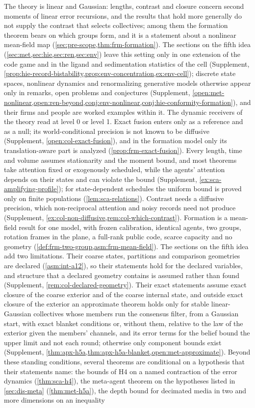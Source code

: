 The theory is linear and Gaussian: lengths, contrast and closure concern second moments of linear error recursions, and the results that hold more generally do not supply the contrast that selects collectives; among them the formation theorem bears on which groups form, and it is a statement about a nonlinear mean-field map (\cref{sec:pre-scope,thm:frm-formation}). The sections on the fifth idea (\cref{sec:met,sec:hie,sec:ren,sec:env}) leave this setting only in one extension of the code game and in the ligand and sedimentation statistics of the cell (Supplement, \cref{prop:hie-record-bistability,prop:env-concentration,ex:env-cell}); discrete state spaces, nonlinear dynamics and renormalizing generative models otherwise appear only in remarks, open problems and conjectures (Supplement, \cref{open:met-nonlinear,open:ren-beyond,conj:env-nonlinear,conj:hie-conformity-formation}), and their firms and people are worked examples within it. The dynamic receivers of the theory read at level 0 or level 1. Exact fusion enters only as a reference and as a null; its world-conditional precision is not known to be diffusive (Supplement, \cref{open:col-exact-fusion}), and in the formation model only its translation-aware part is analyzed (\cref{prop:frm-exact-fusion}). Every length, time and volume assumes stationarity and the moment bound, and most theorems take attention fixed or exogenously scheduled, while the agents' attention depends on their states and can violate the bound (Supplement, \cref{ex:sca-amplifying-profile}); for state-dependent schedules the uniform bound is proved only on finite populations (\cref{lem:sca-relations}). Contrast needs a diffusive precision, which non-reciprocal attention and noisy records need not produce (Supplement, \cref{ex:col-non-diffusive,rem:col-which-contrast}). Formation is a mean-field result for one model, with frozen calibration, identical agents, two groups, rotation frames in the plane, a full-rank public code, scarce capacity and no geometry (\cref{def:frm-two-group,asm:frm-mean-field}). The sections on the fifth idea add two limitations. Their coarse states, partitions and comparison geometries are declared (\cref{asm:int-a12}), so their statements hold for the declared variables, and structure that a declared geometry contains is assumed rather than found (Supplement, \cref{rem:col-declared-geometry}). Their exact statements assume exact closure of the coarse exterior and of the coarse internal state, and outside exact closure of the exterior an approximate theorem holds only for stable linear-Gaussian collectives whose members run the consensus filter, from a Gaussian start, with exact blanket conditions or, without them, relative to the law of the exterior given the members' channels, and its error terms for the belief bound the upper limit and not each round; otherwise only component bounds exist (Supplement, \cref{thm:apx-h5a,thm:apx-h5a-blanket,open:met-approximate}). Beyond these standing conditions, several theorems are conditional on a hypothesis that their statements name: the bounds of H4 on a named contraction of the error dynamics (\cref{thm:sca-h4}), the meta-agent theorem on the hypotheses listed in \cref{sec:dis-meta} (\cref{thm:met-h5a}), the depth bound for decimated media in two and more dimensions on an inequality 